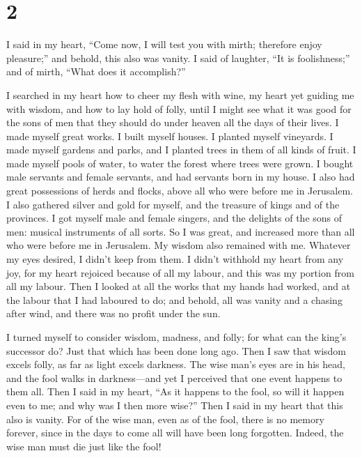 \hypertarget{section-1}{%
\section{2}\label{section-1}}

 I said in my heart, ``Come now, I will test you with
mirth; therefore enjoy pleasure;'' and behold, this also was vanity.
 I said of laughter, ``It is foolishness;'' and of mirth,
``What does it accomplish?''

 I searched in my heart how to cheer my flesh with wine,
my heart yet guiding me with wisdom, and how to lay hold of folly, until
I might see what it was good for the sons of men that they should do
under heaven all the days of their lives.  I made myself
great works. I built myself houses. I planted myself vineyards.
 I made myself gardens and parks, and I planted trees in
them of all kinds of fruit.  I made myself pools of water,
to water the forest where trees were grown.  I bought male
servants and female servants, and had servants born in my house. I also
had great possessions of herds and flocks, above all who were before me
in Jerusalem.  I also gathered silver and gold for myself,
and the treasure of kings and of the provinces. I got myself male and
female singers, and the delights of the sons of men: musical instruments
of all sorts.  So I was great, and increased more than all
who were before me in Jerusalem. My wisdom also remained with me.
 Whatever my eyes desired, I didn't keep from them. I
didn't withhold my heart from any joy, for my heart rejoiced because of
all my labour, and this was my portion from all my labour.
 Then I looked at all the works that my hands had worked,
and at the labour that I had laboured to do; and behold, all was vanity
and a chasing after wind, and there was no profit under the sun.

 I turned myself to consider wisdom, madness, and folly;
for what can the king's successor do? Just that which has been done long
ago.  Then I saw that wisdom excels folly, as far as
light excels darkness.  The wise man's eyes are in his
head, and the fool walks in darkness---and yet I perceived that one
event happens to them all.  Then I said in my heart, ``As
it happens to the fool, so will it happen even to me; and why was I then
more wise?'' Then I said in my heart that this also is vanity.
 For of the wise man, even as of the fool, there is no
memory forever, since in the days to come all will have been long
forgotten. Indeed, the wise man must die just like the fool!

